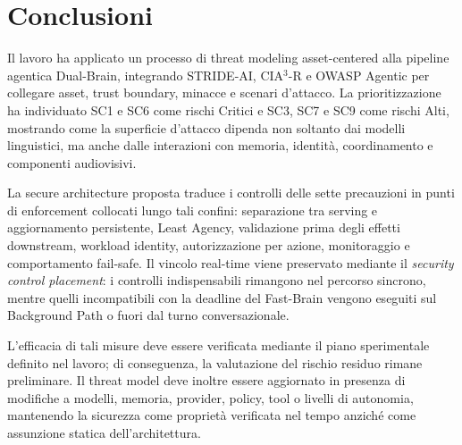 \documentclass[11pt,a4paper]{article}
\begin{document}
\section{Conclusioni}
\label{sec:conclusions}

Il lavoro ha applicato un processo di threat modeling asset-centered
alla pipeline agentica Dual-Brain, integrando STRIDE-AI, CIA$^3$-R e
OWASP Agentic per collegare asset, trust boundary, minacce e scenari
d'attacco. La prioritizzazione ha individuato SC1 e SC6 come rischi
Critici e SC3, SC7 e SC9 come rischi Alti, mostrando come la superficie
d'attacco dipenda non soltanto dai modelli linguistici, ma anche dalle
interazioni con memoria, identità, coordinamento e componenti
audiovisivi.

La secure architecture proposta traduce i controlli delle sette
precauzioni in punti di enforcement collocati lungo tali confini:
separazione tra serving e aggiornamento persistente, Least Agency,
validazione prima degli effetti downstream, workload identity,
autorizzazione per azione, monitoraggio e comportamento fail-safe. Il
vincolo real-time viene preservato mediante il
\emph{security control placement}: i controlli indispensabili rimangono
nel percorso sincrono, mentre quelli incompatibili con la deadline del
Fast-Brain vengono eseguiti sul Background Path o fuori dal turno
conversazionale.

L'efficacia di tali misure deve essere verificata mediante il piano
sperimentale definito nel lavoro; di conseguenza, la valutazione del
rischio residuo rimane preliminare. Il threat model deve inoltre essere
aggiornato in presenza di modifiche a modelli, memoria, provider,
policy, tool o livelli di autonomia, mantenendo la sicurezza come
proprietà verificata nel tempo anziché come assunzione statica
dell'architettura.
\end{document}
